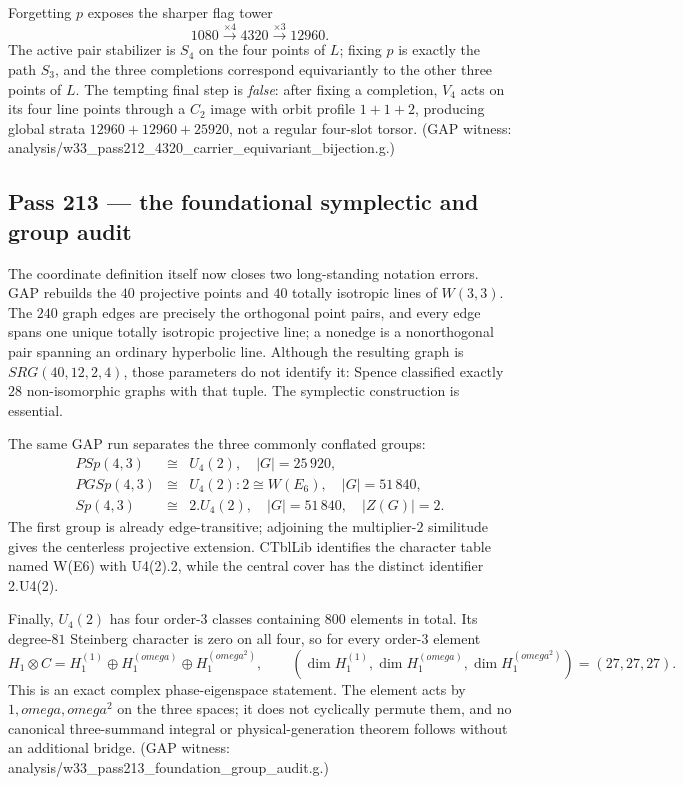 \documentclass[12pt,a4paper]{article}
\def\mathbb#1{#1}%
\def\mathrm#1{#1}%
\def\texttt#1{#1}%
\def\omega{omega}%
\theoremstyle{definition}
\newcommand{\SRG}{\mathrm{SRG}}
\newcommand{\Sp}{\mathrm{Sp}}
\newcommand{\PSp}{\mathrm{PSp}}
\newcommand{\PGSp}{\mathrm{PGSp}}
\begin{document}
Forgetting $p$ exposes the sharper flag tower
\[
  1080\xrightarrow{\times4}4320\xrightarrow{\times3}12960.
\]
The active pair stabilizer is $S_4$ on the four points of $L$; fixing $p$
is exactly the path $S_3$, and the three completions correspond
equivariantly to the other three points of $L$.  The tempting final step is
\emph{false}: after fixing a completion, $V_4$ acts on its four line points
through a $C_2$ image with orbit profile $1+1+2$, producing global strata
$12960+12960+25920$, not a regular four-slot torsor. (GAP witness:
\texttt{analysis/w33\_pass212\_4320\_carrier\_equivariant\_bijection.g}.)

\subsection{Pass 213 --- the foundational symplectic and group audit}
\label{ssec:pass213}

The coordinate definition itself now closes two long-standing notation
errors.  GAP rebuilds the $40$ projective points and $40$ totally isotropic
lines of $W(3,3)$.  The $240$ graph edges are precisely the orthogonal point
pairs, and every edge spans one unique totally isotropic projective line;
a nonedge is a nonorthogonal pair spanning an ordinary hyperbolic line.
Although the resulting graph is $\SRG(40,12,2,4)$, those parameters do not
identify it: Spence classified exactly $28$ non-isomorphic graphs with that
tuple.  The symplectic construction is essential.

The same GAP run separates the three commonly conflated groups:
\[
\begin{array}{ccl}
\PSp(4,3)&\cong&U_4(2),\quad |G|=25\,920,\\
\PGSp(4,3)&\cong&U_4(2){:}2\cong W(E_6),\quad |G|=51\,840,\\
\Sp(4,3)&\cong&2.U_4(2),\quad |G|=51\,840,\quad |Z(G)|=2.
\end{array}
\]
The first group is already edge-transitive; adjoining the multiplier-$2$
similitude gives the centerless projective extension.  CTblLib identifies
the character table named \texttt{W(E6)} with \texttt{U4(2).2}, while the
central cover has the distinct identifier \texttt{2.U4(2)}.

Finally, $U_4(2)$ has four order-$3$ classes containing $800$ elements in
total.  Its degree-$81$ Steinberg character is zero on all four, so for every
order-$3$ element
\[
H_1\otimes\mathbb C
 = H_1^{(1)}\oplus H_1^{(\omega)}\oplus H_1^{(\omega^2)},
\qquad
(\dim H_1^{(1)},\dim H_1^{(\omega)},\dim H_1^{(\omega^2)})=(27,27,27).
\]
This is an exact complex phase-eigenspace statement.  The element acts by
$1,\omega,\omega^2$ on the three spaces; it does not cyclically permute them,
and no canonical three-summand integral or physical-generation theorem
follows without an additional bridge. (GAP witness:
\texttt{analysis/w33\_pass213\_foundation\_group\_audit.g}.)
\end{document}
